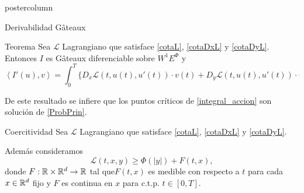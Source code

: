 \documentclass[final,hyperref={pdfpagelabels=false}]{beamer}
\newlength{\columnheight}
\begin{document}
\begin{frame}
\begin{columns}

    \begin{column}{.49\textwidth}
      \begin{beamercolorbox}[center,wd=\textwidth]{postercolumn}
        \begin{minipage}[T]{.95\textwidth} %
          \parbox[t][\columnheight]{\textwidth}{ %





\begin{block}{Derivabilidad G\^ateaux}
\begin{minipage}[T]{.9\textwidth}
\begin{block}{Teorema \cite{ABGMS2015}}
Sea  $\mathcal{L}$ Lagrangiano que satisface \eqref{cotaL}, \eqref{cotaDxL} y \eqref{cotaDyL}.
Entonces $I$ es G\^ateaux diferenciable sobre $W^1E^{\Phi}$ y  
\[\left\langle I'(u),v\right\rangle=
\int_0^T
\{
D_x\mathcal{L}(t,u(t),u'(t))\cdot v(t) +
D_y\mathcal{L}(t,u(t),u'(t))\cdot v'(t) 
\}\,dt.
\]
\end{block}

De este resultado se infiere que los puntos críticos de \eqref{integral_accion}
son solución de \eqref{ProbPrin}.

\end{minipage}
\end{block}




            \begin{block}{Coercitividad}
Sea  $\mathcal{L}$ Lagrangiano que satisface \eqref{cotaL}, \eqref{cotaDxL} y \eqref{cotaDyL}.

Además consideramos 
\begin{equation}\label{cota_inf}
\mathcal{L}(t,x,y)\geq \Phi\left(|y|\right)+ F(t,x),
\end{equation}
donde $F:\mathbb{R}\times\mathbb{R}^d\to\mathbb{R}$ tal que$F(t,x)$ es  medible con respecto a $t$ para cada  $x\in\mathbb{R}^d$ fijo y $F$ es continua en  $x$ para c.t.p. $t\in [0,T]$. 


\end{block}}
\end{minipage}
\end{beamercolorbox}
\end{column}
\end{columns}
\end{frame}
\end{document}
